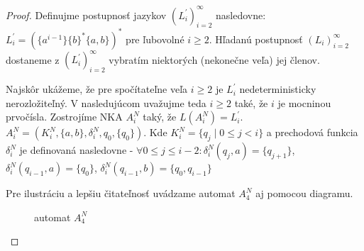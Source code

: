 \begin{proof}
Definujme postupnosť jazykov $ (L^{\prime}_i)_{i=2}^{\infty} $ nasledovne: $ L^{\prime}_i = (\lbrace a^{i-1} \rbrace \lbrace b \rbrace^* \lbrace a,b \rbrace)^* $ pre ľubovolné $ i \geq 2 $. Hľadanú postupnosť $ (L_i)_{i=2}^{\infty} $ dostaneme z $ (L^{\prime}_i)_{i=2}^{\infty} $ vybratím niektorých (nekonečne veľa) jej členov.
\par
Najskôr ukážeme, že pre spočítateľne veľa $ i \geq 2 $ je $ L^{\prime}_i $ nedeterministicky nerozložiteľný. V nasledujúcom uvažujme teda $ i \geq 2 $ také, že $ i $ je mocninou prvočísla. Zostrojíme NKA $ A_i^N $ taký, že $ L(A_i^N) = L^{\prime}_i $. $ A_i^N = (K_i^N, \lbrace a,b \rbrace, \delta_i^N,q_0,\lbrace q_0 \rbrace) $. Kde $ K_i^N = \lbrace q_j \; | \; 0 \leq j < i \rbrace $ a prechodová funkcia $ \delta_i^N $ je definovaná nasledovne - $ \forall 0 \leq j \leq i-2: \delta_i^N(q_j,a) = \lbrace q_{j+1} \rbrace $, $ \delta_i^N(q_{i-1},a)=\lbrace q_0 \rbrace  $, $ \delta_i^N(q_{i-1},b)=\lbrace q_0,q_{i-1} \rbrace  $

Pre ilustráciu a lepšiu čitateľnosť uvádzame automat $ A_4^N $ aj pomocou diagramu.

\begin{figure}[H]
\centering
{}
\caption{automat $ A_4^N $}
\end{figure}


\end{proof}
